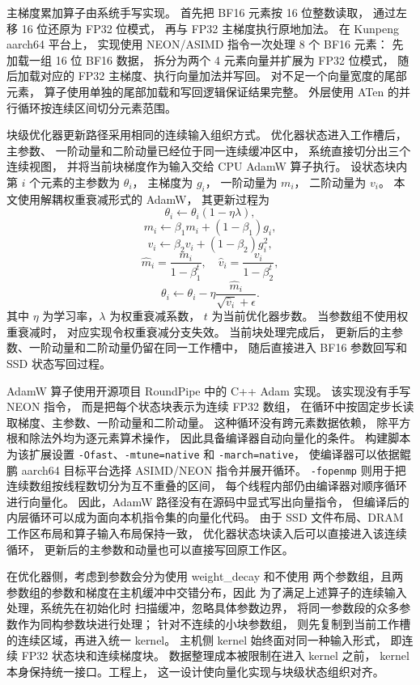 \documentclass[bachelor,openany,oneside,color,AutoFakeBold=true]{buaathesis}
\begin{document}
主梯度累加算子由系统手写实现。
首先把 BF16 元素按 16 位整数读取，
通过左移 16 位还原为 FP32 位模式，
再与 FP32 主梯度执行原地加法。
在 Kunpeng aarch64 平台上，
实现使用 NEON/ASIMD 指令一次处理 8 个 BF16 元素：
先加载一组 16 位 BF16 数据，
拆分为两个 4 元素向量并扩展为 FP32 位模式，
随后加载对应的 FP32 主梯度、执行向量加法并写回。
对不足一个向量宽度的尾部元素，
算子使用单独的尾部加载和写回逻辑保证结果完整。
外层使用 ATen 的并行循环按连续区间切分元素范围。

块级优化器更新路径采用相同的连续输入组织方式。
优化器状态进入工作槽后，主参数、
一阶动量和二阶动量已经位于同一连续缓冲区中，
系统直接切分出三个连续视图，
并将当前块梯度作为输入交给 CPU AdamW 算子执行。
设状态块内第 $i$ 个元素的主参数为 $\theta_i$，
主梯度为 $g_i$，
一阶动量为 $m_i$，
二阶动量为 $v_i$。
本文使用解耦权重衰减形式的 AdamW，
其更新过程为
\[
\theta_i \leftarrow \theta_i(1-\eta\lambda),
\]
\[
m_i \leftarrow \beta_1 m_i + (1-\beta_1)g_i,
\]
\[
v_i \leftarrow \beta_2 v_i + (1-\beta_2)g_i^2,
\]
\[
\hat{m}_i = \frac{m_i}{1-\beta_1^t}, \quad
\hat{v}_i = \frac{v_i}{1-\beta_2^t},
\]
\[
\theta_i \leftarrow \theta_i -
\eta \frac{\hat{m}_i}{\sqrt{\hat{v}_i}+\epsilon}.
\]
其中 $\eta$ 为学习率，$\lambda$ 为权重衰减系数，
$t$ 为当前优化器步数。
当参数组不使用权重衰减时，
对应实现令权重衰减分支失效。
当前块处理完成后，
更新后的主参数、一阶动量和二阶动量仍留在同一工作槽中，
随后直接进入 BF16 参数回写和 SSD 状态写回过程。

AdamW 算子使用开源项目 RoundPipe 中的 C++ Adam 实现。
该实现没有手写 NEON 指令，
而是把每个状态块表示为连续 FP32 数组，
在循环中按固定步长读取梯度、主参数、一阶动量和二阶动量。
这种循环没有跨元素数据依赖，
除平方根和除法外均为逐元素算术操作，
因此具备编译器自动向量化的条件。
构建脚本为该扩展设置 \texttt{-Ofast}、\texttt{-mtune=native}
和 \texttt{-march=native}，
使编译器可以依据鲲鹏 aarch64 目标平台选择 ASIMD/NEON 指令并展开循环。
\texttt{-fopenmp} 则用于把连续数组按线程数切分为互不重叠的区间，
每个线程内部仍由编译器对顺序循环进行向量化。
因此，AdamW 路径没有在源码中显式写出向量指令，
但编译后的内层循环可以成为面向本机指令集的向量化代码。
由于 SSD 文件布局、DRAM 工作区布局和算子输入布局保持一致，
优化器状态块读入后可以直接进入该连续循环，
更新后的主参数和动量也可以直接写回原工作区。

在优化器侧，考虑到参数会分为使用 weight\_decay 和不使用
两个参数组，且两参数组的参数和梯度在主机缓冲中交错分布，因此
为了满足上述算子的连续输入处理，系统先在初始化时
扫描缓冲，忽略具体参数边界，
将同一参数段的众多参数作为同构参数块进行处理；
针对不连续的小块参数组，
则先复制到当前工作槽的连续区域，再进入统一 kernel。
主机侧 kernel 始终面对同一种输入形式，
即连续 FP32 状态块和连续梯度块。
数据整理成本被限制在进入 kernel 之前，
kernel 本身保持统一接口。工程上，
这一设计使向量化实现与块级状态组织对齐。
\end{document}
